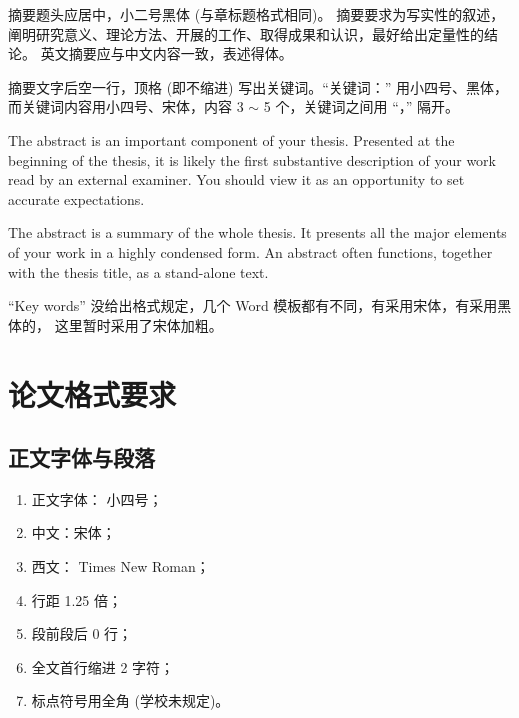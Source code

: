 \documentclass{swputhesis}
\begin{document}
\makecover

\frontmatter

\begin{cabstract}
	摘要题头应居中，小二号黑体 (与章标题格式相同)。
	摘要要求为写实性的叙述，阐明研究意义、理论方法、开展的工作、取得成果和认识，最好给出定量性的结论。
	英文摘要应与中文内容一致，表述得体。

	摘要文字后空一行，顶格 (即不缩进) 写出关键词。``关键词：'' 用小四号、黑体，
	而关键词内容用小四号、宋体，内容 3 $\sim$ 5 个，关键词之间用  ``，'' 隔开。
\end{cabstract}

\begin{eabstract}
	The abstract is an important component of your thesis. Presented at the 
	beginning of the thesis, it is likely the first substantive description of 
	your work read by an external examiner. You should view it as an opportunity 
	to set accurate expectations.

	The abstract is a summary of the whole thesis. It presents all the major 
	elements of your work in a highly condensed form.
	An abstract often functions, together with the thesis title,
	as a stand-alone text.

	``Key words'' 没给出格式规定，几个 Word 模板都有不同，有采用宋体，有采用黑体的，
		这里暂时采用了宋体加粗。
\end{eabstract}


\tableofcontents

\mainmatter

\chapter{论文格式要求}

\section{正文字体与段落}

\begin{enumerate}
	\item 正文字体： 小四号；
	\item 中文：宋体；
	\item 西文： Times New Roman；
	\item 行距 1.25 倍；
	\item 段前段后 0 行；
	\item 全文首行缩进 2 字符；
	\item 标点符号用全角 (学校未规定)。
\end{enumerate}
\end{document}

